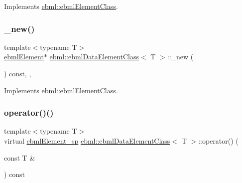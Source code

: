 Implements \mbox{\hyperlink{classebml_1_1ebmlElementClass_aedbfff5909af215acaa3ca28643f1bc9}{ebml\+::ebml\+Element\+Class}}.

\mbox{\label{classebml_1_1ebmlDataElementClass_a79fabffdfd33bee94cd14416646da546}} 
\subsubsection{\texorpdfstring{\+\_\+new()}{\_new()}}
{\footnotesize\ttfamily template$<$typename T$>$ \\
\mbox{\hyperlink{classebml_1_1ebmlElement}{ebml\+Element}}$\ast$ \mbox{\hyperlink{classebml_1_1ebmlDataElementClass}{ebml\+::ebml\+Data\+Element\+Class}}$<$ T $>$\+::\+\_\+new (\begin{DoxyParamCaption}{ }\end{DoxyParamCaption}) const\hspace{0.3cm}{\ttfamily [override]}, {\ttfamily [protected]}, {\ttfamily [virtual]}}



Implements \mbox{\hyperlink{classebml_1_1ebmlElementClass_a223ede6b8bc3c85251d2d73f0256fb45}{ebml\+::ebml\+Element\+Class}}.

\mbox{\label{classebml_1_1ebmlDataElementClass_af50d05f41174fbac6efa1a8cbdc5b4fe}} 
\subsubsection{\texorpdfstring{operator()()}{operator()()}\hspace{0.1cm}{\footnotesize\ttfamily [1/2]}}
{\footnotesize\ttfamily template$<$typename T$>$ \\
virtual \mbox{\hyperlink{namespaceebml_adad533b7705a16bb360fe56380c5e7be}{ebml\+Element\+\_\+sp}} \mbox{\hyperlink{classebml_1_1ebmlDataElementClass}{ebml\+::ebml\+Data\+Element\+Class}}$<$ T $>$\+::operator() (\begin{DoxyParamCaption}\item[{const T \&}]{ }\end{DoxyParamCaption}) const\hspace{0.3cm}{\ttfamily [virtual]}}


